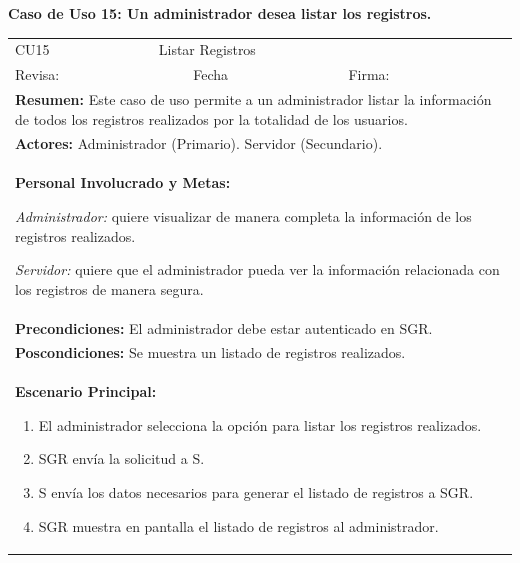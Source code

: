 		\textbf{Caso de Uso 15: Un administrador desea listar los registros.}
			\begin{longtable}{|l|p{5.5cm}|l|p{2cm}|l|p{1.9cm}|} \hline
					\cellcolor{grisOscuro} CU15 & \multicolumn{4}{|l|}{  \cellcolor{grisOscuro} Listar Registros} &  \cellcolor{grisClaro}\multirow{2}{1cm}{} \\ \cline{1-5}
					\cellcolor{grisOscuro} Revisa: &  \cellcolor{grisClaro} &  \cellcolor{grisOscuro} Fecha &  \cellcolor{grisClaro} &  \cellcolor{grisOscuro} Firma: & \cellcolor{grisClaro} \\ \hline
					\multicolumn{6}{|p{15cm}|}{ \textbf{Resumen: } Este caso de uso permite a un administrador listar la información de todos los registros realizados por la totalidad de los usuarios.

					} \\ \hline

					\multicolumn{6}{|p{15cm}|}{ \textbf{Actores: } Administrador (Primario). Servidor (Secundario).

					} \\ \hline

					\multicolumn{6}{|p{15cm}|}{ \textbf{Personal Involucrado y Metas: }

					\emph{Administrador:} quiere visualizar de manera completa la información de los registros realizados.

					\emph{Servidor:} quiere que el administrador pueda ver la información relacionada con los registros de manera segura.

					} \\ \hline

					\multicolumn{6}{|p{15cm}|}{ \textbf{Precondiciones: } El administrador debe estar autenticado en SGR.

					} \\ \hline

					\multicolumn{6}{|p{15cm}|}{ \textbf{Poscondiciones: } Se muestra un listado de registros realizados.

					} \\ \hline

					\multicolumn{6}{|p{15cm}|}{ \textbf{Escenario Principal: }

					\begin{enumerate}
							\item El administrador selecciona la opción para listar los registros realizados.
							\item SGR envía la solicitud a S.
							\item S envía los datos necesarios para generar el listado de registros a SGR.
							\item SGR muestra en pantalla el listado de registros al administrador.
					\end{enumerate}

}
\end{longtable}

